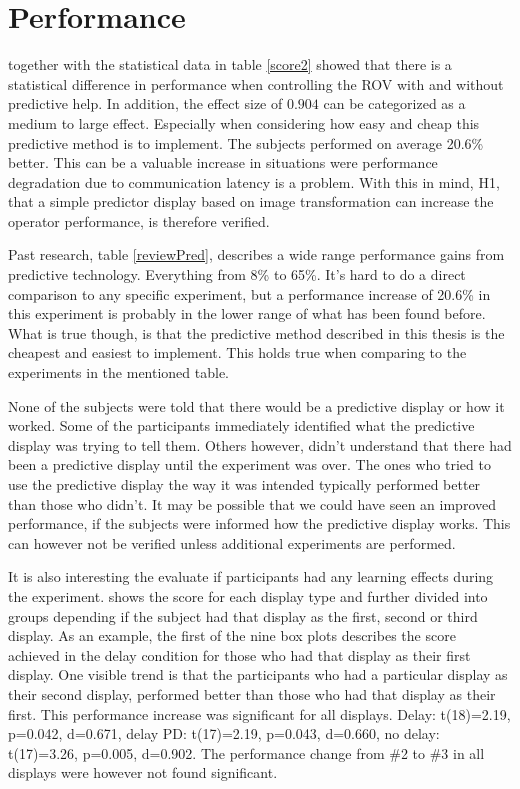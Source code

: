 \section{Performance}

 together with the statistical data in table \ref{score2} showed that there is a statistical difference in performance when controlling the ROV with and without predictive help. In addition, the effect size of $0.904$ can be categorized as a medium to large effect. Especially when considering how easy and cheap this predictive method is to implement. The subjects performed on average 20.6\% better. This can be a valuable increase in situations were performance degradation due to communication latency is a problem. With this in mind, H1, that a simple predictor display based on image transformation can increase the operator performance, is therefore verified.

Past research, table \ref{reviewPred}, describes a wide range performance gains from predictive technology. Everything from 8\% to 65\%. It's hard to do a direct comparison to any specific experiment, but a performance increase of 20.6\% in this experiment is probably in the lower range of what has been found before. What is true though, is that the predictive method described in this thesis is the cheapest and easiest to implement. This holds true when comparing to the experiments in the mentioned table.

None of the subjects were told that there would be a predictive display or how it worked. Some of the participants immediately identified what the predictive display was trying to tell them. Others however, didn't understand that there had been a predictive display until the experiment was over. The ones who tried to use the predictive display the way it was intended typically performed better than those who didn't. It may be possible that we could have seen an improved performance, if the subjects were informed how the predictive display works. This can however not be verified unless additional experiments are performed.

It is also interesting the evaluate if participants had any learning effects during the experiment.  shows the score for each display type and further divided into groups depending if the subject had that display as the first, second or third display. As an example, the first of the nine box plots describes the score achieved in the delay condition for those who had that display as their first display. One visible trend is that the participants who had a particular display as their second display, performed better than those who had that display as their first. This performance increase was significant for all displays. Delay: t(18)=2.19, p=0.042, d=0.671, delay PD: t(17)=2.19, p=0.043, d=0.660, no delay: t(17)=3.26, p=0.005, d=0.902. The performance change from \#2 to \#3 in all displays were however not found significant.

